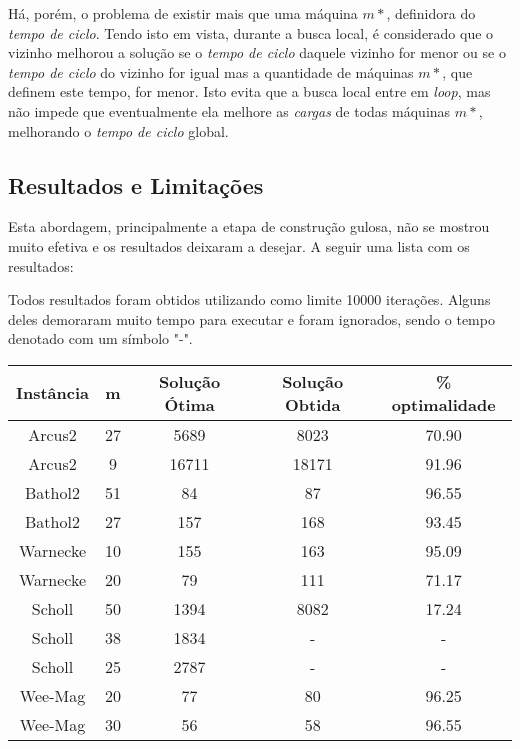 \documentclass{report}
\begin{document}
Há, porém, o problema de existir mais que uma máquina $m*$,
definidora do \emph{tempo de ciclo}. Tendo isto em vista,
durante a busca local, é considerado que o vizinho melhorou a
solução se o \emph{tempo de ciclo} daquele vizinho for
menor ou se o \emph{tempo de ciclo} do vizinho for igual mas a
quantidade de máquinas $m*$, que definem este tempo, for
menor. Isto evita que a busca local entre em \emph{loop}, mas não impede que
eventualmente ela melhore as \emph{cargas} de
todas máquinas $m*$, melhorando o \emph{tempo de ciclo} global.

\subsection{Resultados e Limitações}

Esta abordagem, principalmente a etapa de construção gulosa, não se mostrou muito
efetiva e os resultados deixaram a desejar. A seguir uma lista com os resultados:

Todos resultados foram obtidos utilizando como limite 10000 iterações. Alguns deles
demoraram muito tempo para executar e foram ignorados, sendo o tempo denotado com
um símbolo "-".

\begin{table}[htbp]
 \begin{tabular}{|c|c|c|c|c|}
  \hline
  \textbf{Instância} & \textbf{m} & \textbf{Solução Ótima} & \textbf{Solução Obtida} & \% optimalidade \\
  \hline
  Arcus2 & 27 & 5689 & 8023 & 70.90 \\
  \hline
  Arcus2 & 9 & 16711 & 18171 & 91.96 \\
  \hline
  Bathol2 & 51 & 84 & 87 & 96.55 \\
  \hline
  Bathol2 & 27 & 157 & 168 & 93.45 \\
  \hline
  Warnecke & 10 & 155 & 163 & 95.09 \\
  \hline
  Warnecke & 20 & 79 & 111 & 71.17 \\
  \hline
  Scholl & 50 & 1394 & 8082 & 17.24 \\
  \hline
  Scholl & 38 & 1834 & - & - \\
  \hline
  Scholl & 25 & 2787 & - & - \\
  \hline
  Wee-Mag & 20 & 77 & 80 & 96.25 \\
  \hline
  Wee-Mag & 30 & 56 & 58 & 96.55 \\
  \hline
 \end{tabular}
\end{table}
\end{document}
